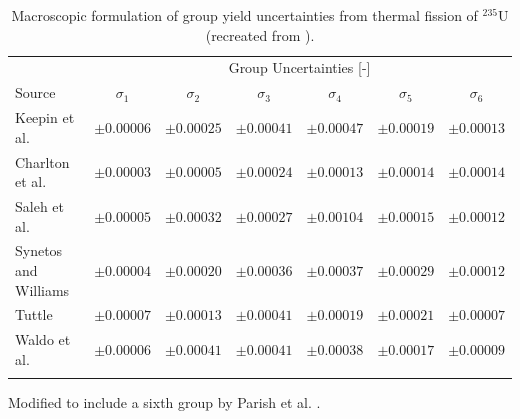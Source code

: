 \begin{table}[!h]
\centering
\begin{threeparttable}
\caption{Macroscopic formulation of group yield uncertainties from thermal fission of $^{235}$U (recreated from \cite{parish1999status}).}
\begin{tabular}{lcccccc}
\hline
 & \multicolumn{6}{c}{Group Uncertainties [-]} \\
Source & $\sigma_1$ & $\sigma_2$ & $\sigma_3$ & $\sigma_4$ & $\sigma_5$ & $\sigma_6$ \\
\hline
Keepin et al. \cite{keepin1957delayed}   & $\pm0.00006$ & $\pm0.00025$ & $\pm0.00041$ & $\pm0.00047$ & $\pm0.00019$ & $\pm0.00013$ \\
Charlton et al. \cite{charlton1996delayed}\tnote{*} & $\pm0.00003$ & $\pm0.00005$ & $\pm0.00024$ & $\pm0.00013$ & $\pm0.00014$ & $\pm0.00014$ \\
Saleh et al. \cite{saleh1997measurements} & $\pm0.00005$ & $\pm0.00032$ & $\pm0.00027$ & $\pm0.00104$ & $\pm0.00015$ & $\pm0.00012$ \\
Synetos and Williams \cite{synetos1983delayed}\tnote{*} & $\pm0.00004$ & $\pm0.00020$ & $\pm0.00036$ & $\pm0.00037$ & $\pm0.00029$ & $\pm0.00012$ \\
Tuttle \cite{tuttle1975delayed}    & $\pm0.00007$ & $\pm0.00013$ & $\pm0.00041$ & $\pm0.00019$ & $\pm0.00021$ & $\pm0.00007$  \\
Waldo et al.\cite{waldo1981delayed}    & $\pm0.00006$ & $\pm0.00041$ & $\pm0.00041$ & $\pm0.00038$ & $\pm0.00017$ & $\pm0.00009$ \\

\hline
\label{tab:macro-yield-delta}
\end{tabular}
\begin{tablenotes}
\item[*] Modified to include a sixth group by Parish et al. \cite{parish1999status}.
\end{tablenotes}
\end{threeparttable}
\end{table}


